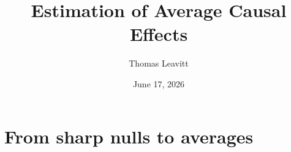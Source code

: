 \documentclass[table, xcolor = {dvipsnames}, 9pt]{beamer}
\title[Estimating Average Causal Effects]{Estimation of Average Causal Effects} %
\author{Thomas Leavitt} %
\institute[] %
{
\medskip
\textit{} %
}
\date{June 17, 2026} %
\theoremstyle{plain}
\begin{document}
\begin{frame}
\titlepage %
\end{frame}


\section{From sharp nulls to averages}
\end{document}
